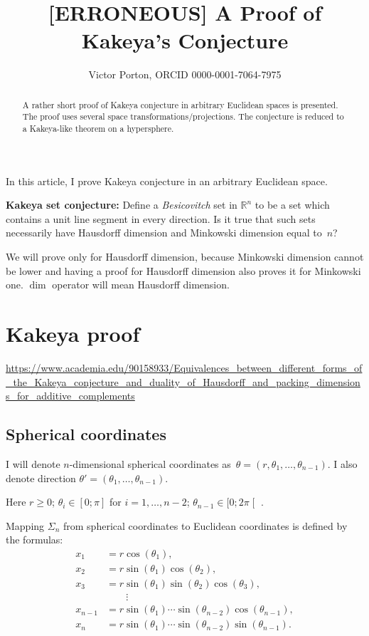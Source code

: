 \documentclass[oneside,draft]{amsart}
\title{[ERRONEOUS] A Proof of Kakeya's Conjecture}
\author{Victor Porton, ORCID 0000-0001-7064-7975}
\begin{document}
\begin{abstract}
A rather short proof of Kakeya conjecture in arbitrary Euclidean spaces is presented. The proof uses several space transformations/projections. The conjecture is reduced to a Ka\-ke\-ya-li\-ke theorem on a hypersphere.
\end{abstract}

\maketitle

In this article, I prove Kakeya conjecture in an arbitrary Euclidean space.

\textbf{Kakeya set conjecture:} \cite{kakeya-long,tao-blog-kakeya} Define a \emph{Besicovitch} set in $\mathbb{R}^n$ to be a set which contains a unit line segment in every direction. Is it true that such sets necessarily have Hausdorff dimension and Minkowski dimension equal to~$n$?

We will prove only for Hausdorff dimension, because Minkowski dimension cannot be lower and having a proof for Hausdorff dimension also proves it for Minkowski one. $\dim$ operator will mean Hausdorff dimension.

\section{Kakeya proof}

\url{https://www.academia.edu/90158933/Equivalences_between_different_forms_of_the_Kakeya_conjecture_and_duality_of_Hausdorff_and_packing_dimensions_for_additive_complements}

\subsection{Spherical coordinates}

I will denote $n$-dimensional spherical coordinates as~$\theta=(r, \theta_1,\dots,\theta_{n-1})$.
I also denote direction $\theta'=(\theta_1,\dots,\theta_{n-1})$.

Here $r\geq 0$; $\theta_i\in[0;\pi]$ for $i=1,\dots,n-2$; $\theta_{n-1}\in[0;2\pi\mathclose[$ .

Mapping $\Sigma_n$ from spherical coordinates to Euclidean coordinates is defined by the formulas:
\[
\begin{aligned}x_{1}&=r\cos(\theta _{1}),\\x_{2}&=r\sin(\theta _{1})\cos(\theta _{2}),\\x_{3}&=r\sin(\theta _{1})\sin(\theta _{2})\cos(\theta _{3}),\\&\qquad \vdots \\x_{n-1}&=r\sin(\theta _{1})\cdots \sin(\theta _{n-2})\cos(\theta _{n-1}),\\x_{n}&=r\sin(\theta _{1})\cdots \sin(\theta _{n-2})\sin(\theta _{n-1}).\end{aligned}
\]
\end{document}
